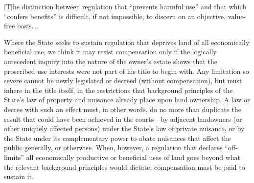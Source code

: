 [T]he
distinction between regulation that ``prevents harmful use'' and that which
``confers benefits'' is difficult, if not impossible, to discern on an
objective, value-free basis\ldots.

Where the State seeks to sustain regulation that deprives land of all
economically beneficial use, we think it may resist compensation only if the
logically antecedent inquiry into the nature of the owner's estate shows that
the proscribed use interests were not part of his title to begin
with.
Any limitation so severe
cannot be newly legislated or decreed (without compensation), but must inhere in
the title itself, in the restrictions that background principles of the State's
law of property and nuisance already place upon land ownership.
A law or decree
with such an effect must, in other words, do no more than duplicate the result
that could have been achieved in the courts---by adjacent landowners (or other
uniquely affected persons) under the State's law of private nuisance, or by the
State under its complementary power to abate nuisances that affect the public
generally, or otherwise.
When, however, a regulation that declares ``off-limits'' all
economically productive or beneficial uses of land goes beyond what the relevant
background principles would dictate, compensation must be paid to sustain it.

